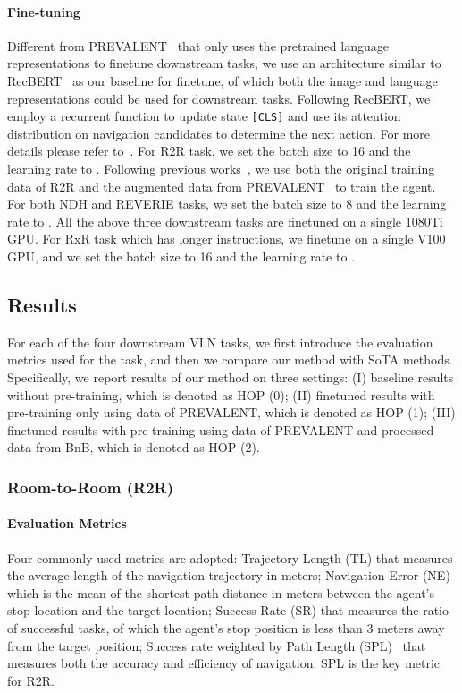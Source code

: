 \documentclass[10pt,twocolumn,letterpaper]{article}
\begin{document}
\paragraph{Fine-tuning}
Different from PREVALENT~\cite{prevalent} that only uses the pretrained language representations to finetune downstream tasks, 
we use an architecture similar to RecBERT~\cite{bertvln} as our baseline for finetune, of which both the image and language representations could be used for downstream tasks.
Following RecBERT, we employ a recurrent function to update state \texttt{[CLS]} and use its attention distribution on navigation candidates to determine the next action. For more details please refer to~\cite{recurrent}.
For R2R task, we set the batch size to 16 and the learning rate to . 
Following previous works~\cite{recurrent}, we use both the original training data of R2R and the augmented data from PREVALENT~\cite{prevalent} to train the agent.
For both NDH and REVERIE tasks, we set the batch size to 8 and the learning rate to .
All the above three downstream tasks are finetuned on a single 1080Ti GPU. 
For RxR task which has longer instructions, we finetune on a single V100 GPU, and we set the batch size to 16 and the learning rate to .

\subsection{Results}
For each of the four downstream VLN tasks, we first introduce the evaluation metrics used for the task, and then we compare our method with SoTA methods. 
Specifically, we report results of our method on three settings: (I) baseline results without pre-training, which is denoted as HOP (0); (II) finetuned results with pre-training only using data of PREVALENT, which is denoted as HOP (1); (III) finetuned results with pre-training using data of PREVALENT and processed data from BnB, which is denoted as HOP (2).

\vspace{-8pt}
\subsubsection{Room-to-Room (R2R)}

\vspace{-5pt}
\paragraph{Evaluation Metrics}
Four commonly used metrics are adopted:
Trajectory Length (TL) that measures the average length of the navigation trajectory in meters;
Navigation Error (NE) which is the mean of the shortest path distance in meters between the agent’s stop location and the target location; 
Success Rate (SR) that measures the ratio of successful tasks, of which the agent's stop position is less than 3 meters away from the target position; 
Success rate weighted by Path Length (SPL)~\cite{spl} that measures both the accuracy and efficiency of navigation. SPL is the key metric for R2R.
\end{document}
